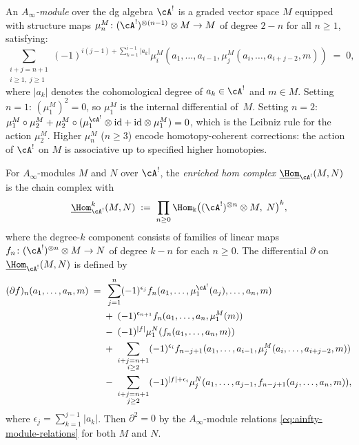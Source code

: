 \begin{definition}
An \emph{$A_\infty$-module} over the dg algebra $\cA^!$
is a graded vector space $M$ equipped with
structure maps $\mu_n^M\colon(\cA^!)^{\otimes(n-1)}\otimes M\to M$
of degree $2-n$ for all $n\ge 1$, satisfying:
\begin{equation}
\sum_{\substack{i+j=n+1 \\ i\ge 1,\; j\ge 1}}
(-1)^{i(j-1)+\sum_{k=1}^{i-1}|a_k|}
\mu_i^M(a_1,\ldots,a_{i-1},
\mu_j^M(a_i,\ldots,a_{i+j-2},m))
\;=\;0,
\end{equation}
where $|a_k|$ denotes the cohomological degree of $a_k\in\cA^!$
and $m\in M$. Setting $n=1$: $(\mu_1^M)^2=0$, so $\mu_1^M$
is the internal differential of~$M$. Setting $n=2$:
$\mu_1^M\circ\mu_2^M+\mu_2^M\circ(\mu_1^{\cA^!}\otimes\mathrm{id}+\mathrm{id}\otimes\mu_1^M)=0$,
which is the Leibniz rule for the action $\mu_2^M$.
Higher $\mu_n^M$ ($n\ge 3$) encode homotopy-coherent corrections:
the action of $\cA^!$ on $M$ is associative up to
specified higher homotopies.
\end{definition}

\begin{definition}
For $A_\infty$-modules $M$ and $N$ over $\cA^!$,
the \emph{enriched hom complex}
$\underline{\Hom}_{\cA^!}(M,N)$ is the chain complex
with
\begin{equation}
\underline{\Hom}_{\cA^!}^k(M,N)
\;:=\;
\prod_{n\ge 0}
\Hom_\Bbbk\bigl((\cA^!)^{\otimes n}\otimes M,\;N\bigr)^k,
\end{equation}
where the degree-$k$ component consists of families of
linear maps $f_n\colon(\cA^!)^{\otimes n}\otimes M\to N$
of degree $k-n$ for each $n\ge 0$. The differential
$\partial$ on $\underline{\Hom}_{\cA^!}(M,N)$ is defined by
\begin{align}
(\partial f)_n(a_1,\ldots,a_n,m)
\;=\;&\;
\sum_{j=1}^{n}(-1)^{\epsilon_j}
f_n(a_1,\ldots,\mu_1^{\cA^!}(a_j),\ldots,a_n,m) \notag \\
&+\;(-1)^{\epsilon_{n+1}}f_n(a_1,\ldots,a_n,\mu_1^M(m)) \notag \\
&-\;(-1)^{|f|}\mu_1^N(f_n(a_1,\ldots,a_n,m)) \notag \\
&+\;\sum_{\substack{i+j=n+1 \\ i\ge 2}}
(-1)^{\epsilon_i}
f_{n-j+1}(a_1,\ldots,a_{i-1},
\mu_j^M(a_i,\ldots,a_{i+j-2},m)) \notag \\
&-\;\sum_{\substack{i+j=n+1 \\ j\ge 2}}
(-1)^{|f|+\epsilon_i}
\mu_j^N(a_1,\ldots,a_{j-1},
f_{n-j+1}(a_j,\ldots,a_n,m)),
\end{align}
where $\epsilon_j=\sum_{k=1}^{j-1}|a_k|$. Then
$\partial^2=0$ by the $A_\infty$-module relations
\eqref{eq:ainfty-module-relations} for both $M$ and $N$.
\end{definition}

